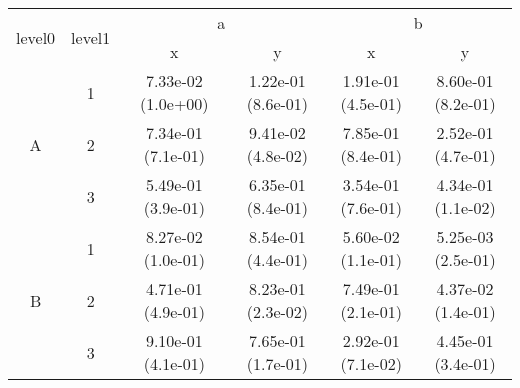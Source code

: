 \begin{tabular}{cccccc}
\toprule
\multirow{2}{*}{level0} & \multirow{2}{*}{level1}&\multicolumn{2}{c}{a}&\multicolumn{2}{c}{b}\tabularnewline
\cmidrule(lr){3-4}
\cmidrule(lr){5-6}
&&x&y&x&y\tabularnewline
\midrule
\multirow{3}{*}{A}&1& 7.33e-02 (1.0e+00)& 1.22e-01 (8.6e-01)& 1.91e-01 (4.5e-01)& 8.60e-01 (8.2e-01)\tabularnewline
&2& 7.34e-01 (7.1e-01)& 9.41e-02 (4.8e-02)& 7.85e-01 (8.4e-01)& 2.52e-01 (4.7e-01)\tabularnewline
&3& 5.49e-01 (3.9e-01)& 6.35e-01 (8.4e-01)& 3.54e-01 (7.6e-01)& 4.34e-01 (1.1e-02)\tabularnewline
\midrule
\multirow{3}{*}{B}&1& 8.27e-02 (1.0e-01)& 8.54e-01 (4.4e-01)& 5.60e-02 (1.1e-01)& 5.25e-03 (2.5e-01)\tabularnewline
&2& 4.71e-01 (4.9e-01)& 8.23e-01 (2.3e-02)& 7.49e-01 (2.1e-01)& 4.37e-02 (1.4e-01)\tabularnewline
&3& 9.10e-01 (4.1e-01)& 7.65e-01 (1.7e-01)& 2.92e-01 (7.1e-02)& 4.45e-01 (3.4e-01)\tabularnewline
\bottomrule
\end{tabular}
